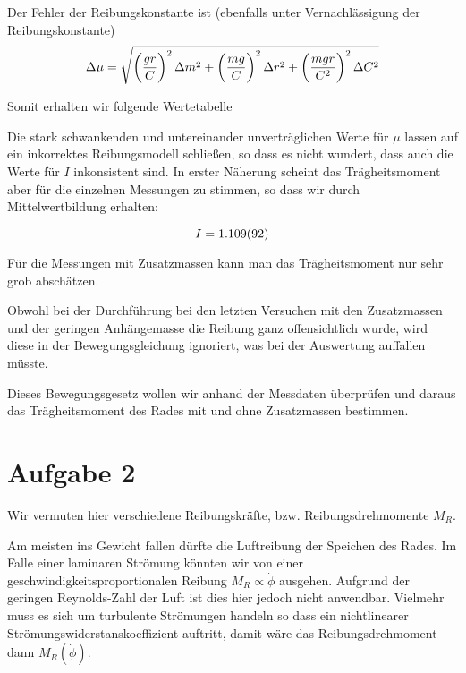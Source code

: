\documentclass[a4paper,german,12pt,smallheadings]{scrartcl}
\begin{document}
Der Fehler der Reibungskonstante ist (ebenfalls unter Vernachlässigung der
Reibungskonstante)
\begin{equation}
  \Delta \mu = \sqrt{
    \del{\frac{gr}{C}}^2 \Delta m^2 +
    \del{\frac{mg}{C}}^2 \Delta r^2 +
    \del{\frac{mgr}{C^2}}^2 \Delta C^2
  }
\end{equation}

Somit erhalten wir folgende Wertetabelle



Die stark schwankenden und untereinander unverträglichen Werte für $\mu$ lassen
auf ein inkorrektes Reibungsmodell schließen, so dass es nicht wundert, dass
auch die Werte für $I$ inkonsistent sind. In erster Näherung scheint das
Trägheitsmoment aber für die einzelnen Messungen zu stimmen, so dass wir durch
Mittelwertbildung erhalten:

\begin{equation}
  I = \num{1.109+-0.092}
\end{equation}

Für die Messungen mit Zusatzmassen kann man das Trägheitsmoment nur sehr grob
abschätzen.

Obwohl bei der Durchführung bei den letzten Versuchen mit den
Zusatzmassen und der geringen Anhängemasse die Reibung ganz offensichtlich
wurde, wird diese in der Bewegungsgleichung ignoriert, was bei der Auswertung
auffallen müsste.


Dieses Bewegungsgesetz wollen wir anhand der Messdaten überprüfen und daraus
das Trägheitsmoment des Rades mit und ohne Zusatzmassen bestimmen.


\section*{Aufgabe 2}
Wir vermuten hier verschiedene Reibungskräfte, bzw. Reibungsdrehmomente $M_R$.

Am meisten ins Gewicht fallen dürfte die Luftreibung der Speichen des Rades. Im
Falle einer laminaren Strömung könnten wir von einer
geschwindigkeitsproportionalen Reibung $M_R \propto \dot{\phi}$ ausgehen.  Aufgrund der geringen
Reynolds-Zahl der Luft ist dies hier jedoch nicht anwendbar. Vielmehr muss es
sich um turbulente Strömungen handeln so dass ein nichtlinearer
Strömungswiderstanskoeffizient auftritt, damit wäre das Reibungsdrehmoment dann
$M_R(\dot{\phi})$.
\end{document}
